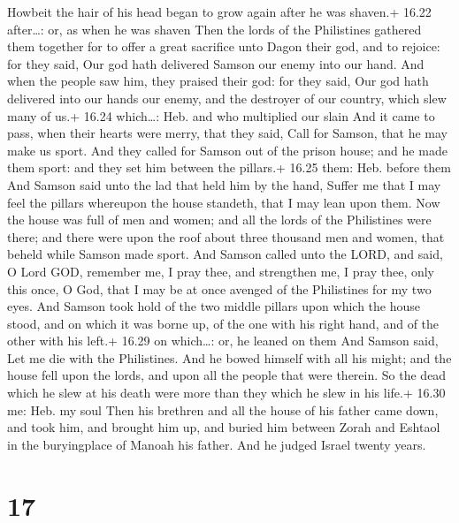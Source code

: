  Howbeit the hair of his head began to grow again after he
was shaven.+ 16.22 after\ldots: or, as when he was shaven 
Then the lords of the Philistines gathered them together for to offer a
great sacrifice unto Dagon their god, and to rejoice: for they said, Our
god hath delivered Samson our enemy into our hand.  And
when the people saw him, they praised their god: for they said, Our god
hath delivered into our hands our enemy, and the destroyer of our
country, which slew many of us.+ 16.24 which\ldots: Heb. and who
multiplied our slain  And it came to pass, when their
hearts were merry, that they said, Call for Samson, that he may make us
sport. And they called for Samson out of the prison house; and he made
them sport: and they set him between the pillars.+ 16.25 them: Heb.
before them  And Samson said unto the lad that held him by
the hand, Suffer me that I may feel the pillars whereupon the house
standeth, that I may lean upon them.  Now the house was
full of men and women; and all the lords of the Philistines were there;
and there were upon the roof about three thousand men and women, that
beheld while Samson made sport.  And Samson called unto the
LORD, and said, O Lord GOD, remember me, I pray thee, and strengthen me,
I pray thee, only this once, O God, that I may be at once avenged of the
Philistines for my two eyes.  And Samson took hold of the
two middle pillars upon which the house stood, and on which it was borne
up, of the one with his right hand, and of the other with his left.+
16.29 on which\ldots: or, he leaned on them  And Samson
said, Let me die with the Philistines. And he bowed himself with all his
might; and the house fell upon the lords, and upon all the people that
were therein. So the dead which he slew at his death were more than they
which he slew in his life.+ 16.30 me: Heb. my soul  Then
his brethren and all the house of his father came down, and took him,
and brought him up, and buried him between Zorah and Eshtaol in the
buryingplace of Manoah his father. And he judged Israel twenty years.

\hypertarget{section-16}{%
\section{17}\label{section-16}}

